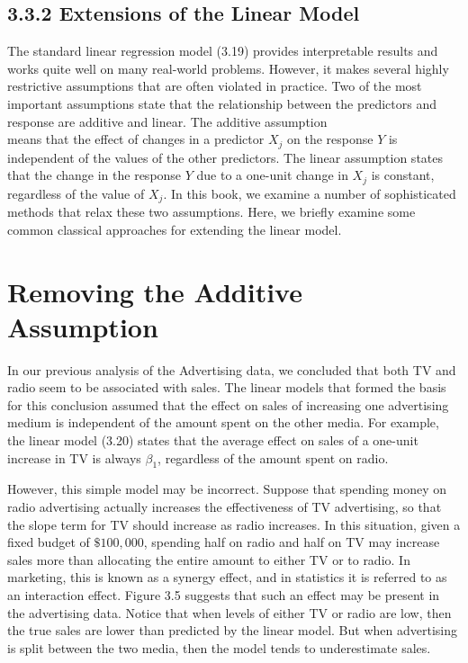 \documentclass[10pt]{article}
\begin{document}
\subsection*{3.3.2 Extensions of the Linear Model}
The standard linear regression model (3.19) provides interpretable results and works quite well on many real-world problems. However, it makes several highly restrictive assumptions that are often violated in practice. Two of the most important assumptions state that the relationship between the predictors and response are additive and linear. The additive assumption\\
means that the effect of changes in a predictor $X_{j}$ on the response $Y$ is independent of the values of the other predictors. The linear assumption states that the change in the response $Y$ due to a one-unit change in $X_{j}$ is constant, regardless of the value of $X_{j}$. In this book, we examine a number of sophisticated methods that relax these two assumptions. Here, we briefly examine some common classical approaches for extending the linear model.

\section*{Removing the Additive Assumption}
In our previous analysis of the Advertising data, we concluded that both TV and radio seem to be associated with sales. The linear models that formed the basis for this conclusion assumed that the effect on sales of increasing one advertising medium is independent of the amount spent on the other media. For example, the linear model (3.20) states that the average effect on sales of a one-unit increase in TV is always $\beta_{1}$, regardless of the amount spent on radio.

However, this simple model may be incorrect. Suppose that spending money on radio advertising actually increases the effectiveness of TV advertising, so that the slope term for TV should increase as radio increases. In this situation, given a fixed budget of $\$ 100,000$, spending half on radio and half on TV may increase sales more than allocating the entire amount to either TV or to radio. In marketing, this is known as a synergy effect, and in statistics it is referred to as an interaction effect. Figure 3.5 suggests that such an effect may be present in the advertising data. Notice that when levels of either TV or radio are low, then the true sales are lower than predicted by the linear model. But when advertising is split between the two media, then the model tends to underestimate sales.
\end{document}
